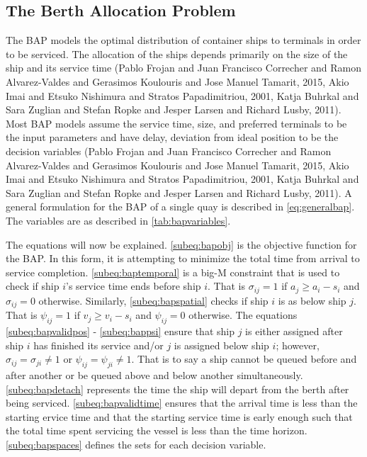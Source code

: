 \documentclass[11pt,a4paper,final]{article}
\begin{document}
\subsection{The Berth Allocation Problem}
\label{sec:orgfa5c402}
The BAP models the optimal distribution of container ships to terminals in order to be serviced. The allocation of the
ships depends primarily on the size of the ship and its service time
(Pablo Frojan and Juan Francisco Correcher and Ramon Alvarez-Valdes and Gerasimos Koulouris and Jose Manuel Tamarit, 2015, Akio Imai and Etsuko Nishimura and Stratos Papadimitriou, 2001, Katja Buhrkal and Sara Zuglian and Stefan Ropke and Jesper Larsen and Richard Lusby, 2011). Most BAP models assume the service
time, size, and preferred terminals to be the input parameters and have delay, deviation from ideal position to be the decision
variables (Pablo Frojan and Juan Francisco Correcher and Ramon Alvarez-Valdes and Gerasimos Koulouris and Jose Manuel Tamarit, 2015, Akio Imai and Etsuko Nishimura and Stratos Papadimitriou, 2001, Katja Buhrkal and Sara Zuglian and Stefan Ropke and Jesper Larsen and Richard Lusby, 2011). A general formulation for the
BAP of a single quay is described in \ref{eq:generalbap}. The variables are as described in \ref{tab:bapvariables}.

The equations will now be explained. \autoref{subeq:bapobj} is the objective function for the BAP. In this form, it is
attempting to minimize the total time from arrival to service completion. \autoref{subeq:baptemporal} is a big-M
constraint that is used to check if ship \(i\)'s service time ends before ship \(i\). That is \(\sigma_{ij}=1\) if \(a_j \ge a_i -
s_i\) and \(\sigma_{ij} = 0\) otherwise. Similarly, \autoref{subeq:bapspatial} checks if ship \(i\) is as below ship \(j\). That is
\(\psi_{ij} = 1\) if \(v_j \ge v_i - s_i\) and \(\psi_{ij} = 0\) otherwise. The equations \autoref{subeq:bapvalidpos} -
\autoref{subeq:bappsi} ensure that ship \(j\) is either assigned after ship \(i\) has finished its service and/or \(j\) is
assigned below ship \(i\); however, \(\sigma_{ij} = \sigma_{ji} \ne 1\) or \(\psi_{ij} = \psi_{ji} \ne 1\). That is to say a ship cannot be queued
before and after another or be queued above and below another simultaneously. \autoref{subeq:bapdetach} represents the
time the ship will depart from the berth after being serviced. \autoref{subeq:bapvalidtime} ensures that the arrival
time is less than the starting ervice time and that the starting service time is early enough such that the total time
spent servicing the vessel is less than the time horizon. \autoref{subeq:bapspaces} defines the sets for each decision
variable.
\end{document}
